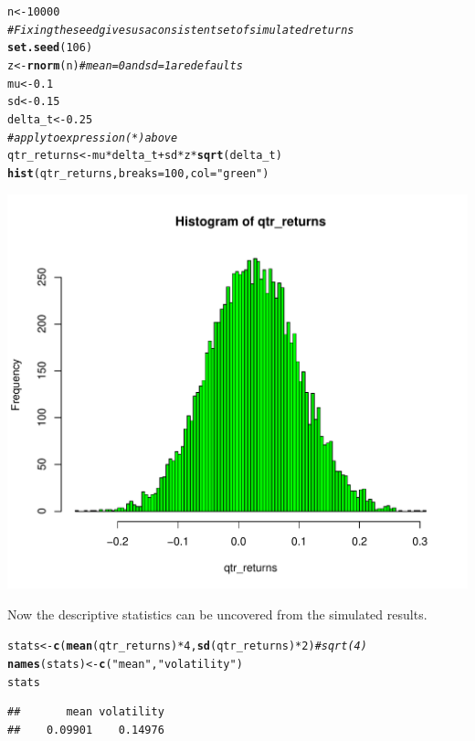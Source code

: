 \documentclass[12pt, a4paper, oneside]{article}\usepackage[]{graphicx}\usepackage[]{color}
\makeatletter
\def\maxwidth{ %
  \ifdim\Gin@nat@width>\linewidth
    \linewidth
  \else
    \Gin@nat@width
  \fi
}
\newcommand{\hlnum}[1]{\textcolor[rgb]{0.686,0.059,0.569}{#1}}%
\newcommand{\hlstr}[1]{\textcolor[rgb]{0.192,0.494,0.8}{#1}}%
\newcommand{\hlcom}[1]{\textcolor[rgb]{0.678,0.584,0.686}{\textit{#1}}}%
\newcommand{\hlopt}[1]{\textcolor[rgb]{0,0,0}{#1}}%
\newcommand{\hlstd}[1]{\textcolor[rgb]{0.345,0.345,0.345}{#1}}%
\newcommand{\hlkwb}[1]{\textcolor[rgb]{0.69,0.353,0.396}{#1}}%
\newcommand{\hlkwc}[1]{\textcolor[rgb]{0.333,0.667,0.333}{#1}}%
\newcommand{\hlkwd}[1]{\textcolor[rgb]{0.737,0.353,0.396}{\textbf{#1}}}%
\newenvironment{kframe}{%
 \def\at@end@of@kframe{}%
 \ifinner\ifhmode%
  \def\at@end@of@kframe{\end{minipage}}%
  \begin{minipage}{\columnwidth}%
 \fi\fi%
 \def\FrameCommand##1{\hskip\@totalleftmargin \hskip-\fboxsep
 \colorbox{shadecolor}{##1}\hskip-\fboxsep
     \hskip-\linewidth \hskip-\@totalleftmargin \hskip\columnwidth}%
 \MakeFramed {\advance\hsize-\width
   \@totalleftmargin\z@ \linewidth\hsize
   \@setminipage}}%
 {\par\unskip\endMakeFramed%
 \at@end@of@kframe}
\newenvironment{knitrout}{}{} %
\makeatother
\begin{document}
\begin{knitrout}
\color{fgcolor}\begin{kframe}
\begin{alltt}
\hlstd{n} \hlkwb{<-} \hlnum{10000}
\hlcom{# Fixing the seed gives us a consistent set of simulated returns}
\hlkwd{set.seed}\hlstd{(}\hlnum{106}\hlstd{)}
\hlstd{z} \hlkwb{<-} \hlkwd{rnorm}\hlstd{(n)}  \hlcom{# mean = 0 and sd = 1 are defaults}
\hlstd{mu} \hlkwb{<-} \hlnum{0.1}
\hlstd{sd} \hlkwb{<-} \hlnum{0.15}
\hlstd{delta_t} \hlkwb{<-} \hlnum{0.25}
\hlcom{# apply to expression (*) above}
\hlstd{qtr_returns} \hlkwb{<-} \hlstd{mu} \hlopt{*} \hlstd{delta_t} \hlopt{+} \hlstd{sd} \hlopt{*} \hlstd{z} \hlopt{*} \hlkwd{sqrt}\hlstd{(delta_t)}
\hlkwd{hist}\hlstd{(qtr_returns,} \hlkwc{breaks} \hlstd{=} \hlnum{100}\hlstd{,} \hlkwc{col} \hlstd{=} \hlstr{"green"}\hlstd{)}
\end{alltt}
\end{kframe}
\includegraphics[width=\maxwidth]{figure/MC} 

\end{knitrout}


Now the descriptive statistics can be uncovered from the simulated results. 
\begin{knitrout}
\color{fgcolor}\begin{kframe}
\begin{alltt}
\hlstd{stats} \hlkwb{<-} \hlkwd{c}\hlstd{(}\hlkwd{mean}\hlstd{(qtr_returns)} \hlopt{*} \hlnum{4}\hlstd{,} \hlkwd{sd}\hlstd{(qtr_returns)} \hlopt{*} \hlnum{2}\hlstd{)}  \hlcom{# sqrt(4)}
\hlkwd{names}\hlstd{(stats)} \hlkwb{<-} \hlkwd{c}\hlstd{(}\hlstr{"mean"}\hlstd{,} \hlstr{"volatility"}\hlstd{)}
\hlstd{stats}
\end{alltt}
\begin{verbatim}
##       mean volatility 
##    0.09901    0.14976
\end{verbatim}
\end{kframe}
\end{knitrout}
\end{document}
